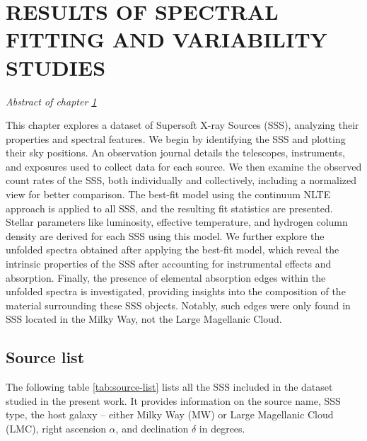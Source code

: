 \def\baselinestretch{1}
\chapter{RESULTS OF SPECTRAL FITTING AND VARIABILITY STUDIES} \label{chap:results}
    \minitoc
    \begin{center}
    	\emph{Abstract of chapter \ref{chap:results}}
    \end{center}
    This chapter explores a dataset of Supersoft X-ray Sources (SSS), analyzing their properties and spectral features. We begin by identifying the SSS and plotting their sky positions. An observation journal details the telescopes, instruments, and exposures used to collect data for each source. We then examine the observed count rates of the SSS, both individually and collectively, including a normalized view for better comparison. The best-fit model using the continuum NLTE approach is applied to all SSS, and the resulting fit statistics are presented. Stellar parameters like luminosity, effective temperature, and hydrogen column density are derived for each SSS using this model. We further explore the unfolded spectra obtained after applying the best-fit model, which reveal the intrinsic properties of the SSS after accounting for instrumental effects and absorption. Finally, the presence of elemental absorption edges within the unfolded spectra is investigated, providing insights into the composition of the material surrounding these SSS objects. Notably, such edges were only found in SSS located in the Milky Way, not the Large Magellanic Cloud.
    
    \newpage
    \section{Source list} \label{results:source-list}
    	The following table \ref{tab:source-list} lists all the SSS included in the dataset studied in the present work. It provides information on the source name, SSS type, the host galaxy -- either Milky Way (MW) or Large Magellanic Cloud (LMC), right ascension $\alpha$, and declination $\delta$ in degrees.
    	
